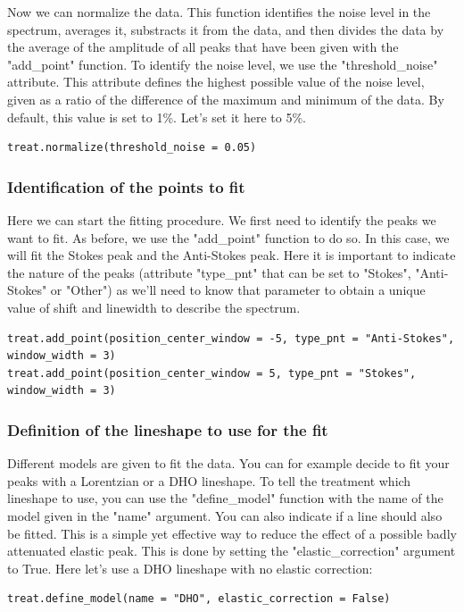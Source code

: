 \documentclass{article}
\begin{document}
Now we can normalize the data. This function identifies the noise level in the spectrum, averages it, substracts it from the data, and then divides the data by the average of the amplitude of all peaks that have been given with the "add\_point" function. To identify the noise level, we use the "threshold\_noise" attribute. This attribute defines the highest possible value of the noise level, given as a ratio of the difference of the maximum and minimum of the data. By default, this value is set to 1\%. Let's set it here to 5\%.
\begin{lstlisting}
treat.normalize(threshold_noise = 0.05)
\end{lstlisting}

\subsubsection{Identification of the points to fit}

Here we can start the fitting procedure. We first need to identify the peaks we want to fit. As before, we use the "add\_point" function to do so. In this case, we will fit the Stokes peak and the Anti-Stokes peak. Here it is important to indicate the nature of the peaks (attribute "type\_pnt" that can be set to "Stokes", "Anti-Stokes" or "Other") as we'll need to know that parameter to obtain a unique value of shift and linewidth to describe the spectrum.
\begin{lstlisting}
treat.add_point(position_center_window = -5, type_pnt = "Anti-Stokes", window_width = 3)
treat.add_point(position_center_window = 5, type_pnt = "Stokes", window_width = 3)
\end{lstlisting}

\subsubsection{Definition of the lineshape to use for the fit}

Different models are given to fit the data. You can for example decide to fit your peaks with a Lorentzian or a DHO lineshape. To tell the treatment which lineshape to use, you can use the "define\_model" function with the name of the model given in the "name" argument. You can also indicate if a line should also be fitted. This is a simple yet effective way to reduce the effect of a possible badly attenuated elastic peak. This is done by setting the "elastic\_correction" argument to True. Here let's use a DHO lineshape with no elastic correction:
\begin{lstlisting}
treat.define_model(name = "DHO", elastic_correction = False)
\end{lstlisting}
\end{document}
